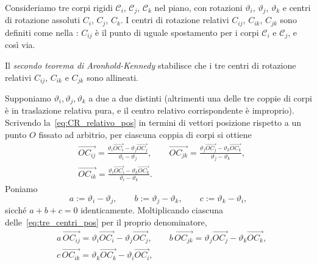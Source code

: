 Consideriamo tre corpi rigidi $\mathcal{C}_i$, $\mathcal{C}_j$, $\mathcal{C}_k$ nel
piano, con rotazioni $\vartheta_i$, $\vartheta_j$, $\vartheta_k$ e centri di
rotazione assoluti $C_i$, $C_j$, $C_k$. I centri
di rotazione relativi $C_{ij}$, $C_{ik}$, $C_{jk}$ sono definiti come nella
: $C_{ij}$ è il punto di uguale spostamento per i corpi
$\mathcal{C}_i$ e $\mathcal{C}_j$, e così via.

Il \textit{secondo teorema di Aronhold-Kennedy} stabilisce che i tre centri di rotazione relativi $C_{ij}$, $C_{ik}$ e $C_{jk}$ sono allineati.

\medskip 

Supponiamo $\vartheta_i,\vartheta_j,\vartheta_k$ a due a due distinti (altrimenti
una delle tre coppie di corpi è in traslazione relativa pura, e il centro relativo
corrispondente è improprio). Scrivendo la~\eqref{eq:CR_relativo_pos} in termini di
vettori posizione rispetto a un punto $O$ fissato ad arbitrio, per ciascuna coppia
di corpi si ottiene
\begin{equation}\label{eq:tre_centri_pos}
\begin{aligned}
	&	\overrightarrow{OC_{ij}} = \frac{\vartheta_i\overrightarrow{OC_i}-\vartheta_j\overrightarrow{OC_j}}{\vartheta_i-\vartheta_j}, \qquad
	\overrightarrow{OC_{jk}} = \frac{\vartheta_j\overrightarrow{OC_j}-\vartheta_k\overrightarrow{OC_k}}{\vartheta_j-\vartheta_k},\\
&	\overrightarrow{OC_{ik}} = \frac{\vartheta_i\overrightarrow{OC_i}-\vartheta_k\overrightarrow{OC_k}}{\vartheta_i-\vartheta_k}.
\end{aligned}
\end{equation}
Poniamo
\begin{equation}
	a:=\vartheta_i-\vartheta_j, \qquad b:=\vartheta_j-\vartheta_k, \qquad c:=\vartheta_k-\vartheta_i,
\end{equation}
sicché $a+b+c=0$ identicamente. Moltiplicando ciascuna delle~\eqref{eq:tre_centri_pos}
per il proprio denominatore,
\begin{equation}
\begin{aligned}
	&	a\,\overrightarrow{OC_{ij}} = \vartheta_i\overrightarrow{OC_i}-\vartheta_j\overrightarrow{OC_j}, \qquad
	b\,\overrightarrow{OC_{jk}} = \vartheta_j\overrightarrow{OC_j}-\vartheta_k\overrightarrow{OC_k}, \\
&	c\,\overrightarrow{OC_{ik}} = \vartheta_k\overrightarrow{OC_k}-\vartheta_i\overrightarrow{OC_i},
\end{aligned}
\end{equation}
